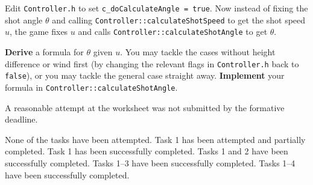 \documentclass{../../../fal_assignment}
\begin{document}
Edit \texttt{Controller.h} to set \lstinline{c_doCalculateAngle = true}.
Now instead of fixing the shot angle $\theta$ and calling \lstinline{Controller::calculateShotSpeed} to get the shot speed $u$,
the game fixes $u$ and calls \lstinline{Controller::calculateShotAngle} to get $\theta$.

\textbf{Derive} a formula for $\theta$ given $u$.
You may tackle the cases without height difference or wind first (by changing the relevant flags in \texttt{Controller.h} back to \lstinline{false}),
or you may tackle the general case straight away.
\textbf{Implement} your formula in \lstinline{Controller::calculateShotAngle}.

\begin{markingrubric}
		\grade\fail	A reasonable attempt at the worksheet was not submitted by the formative deadline.
		
        \grade\fail None of the tasks have been attempted.
		\grade Task 1 has been attempted and partially completed.
		\grade Task 1 has been successfully completed.
		\grade Tasks 1 and 2 have been successfully completed.
		\grade Tasks 1--3 have been successfully completed.
		\grade Tasks 1--4 have been successfully completed.


\end{markingrubric}
\end{document}
